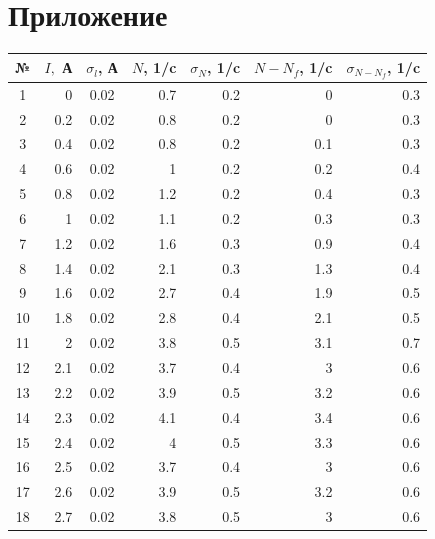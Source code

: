 \documentclass{article}
\begin{document}
\section{Приложение}
\begin{table}[h!]
\centering
\begin{tabular}{|c|r|c|r|r|r|r|}
\hline
№ &
  \multicolumn{1}{c|}{$ I, $ А} &
  $ \sigma_l $, А &
 \multicolumn{1}{c|}{$ N $, 1/c} &
  \multicolumn{1}{l|}{$ \sigma_N $, 1/c} &
  \multicolumn{1}{c|}{$ N - N_f$, 1/c} &
  \multicolumn{1}{c|}{$ \sigma_{N-N_f}$, 1/c} \\ \hline
1                        & 0    & 0.02 & 0.7  & 0.2  & 0    & 0.3 \\ \hline
2                        & 0.2  & 0.02 & 0.8  & 0.2  & 0    & 0.3 \\ \hline
3                        & 0.4  & 0.02 & 0.8  & 0.2  & 0.1  & 0.3 \\ \hline
4                        & 0.6  & 0.02 & 1    & 0.2  & 0.2  & 0.4 \\ \hline
5                        & 0.8  & 0.02 & 1.2  & 0.2  & 0.4  & 0.3 \\ \hline
6                        & 1    & 0.02 & 1.1  & 0.2  & 0.3  & 0.3 \\ \hline
7                        & 1.2  & 0.02 & 1.6  & 0.3  & 0.9  & 0.4 \\ \hline
8                        & 1.4  & 0.02 & 2.1  & 0.3  & 1.3  & 0.4 \\ \hline
9                        & 1.6  & 0.02 & 2.7  & 0.4  & 1.9  & 0.5 \\ \hline
10                       & 1.8  & 0.02 & 2.8  & 0.4  & 2.1  & 0.5 \\ \hline
11                       & 2    & 0.02 & 3.8  & 0.5  & 3.1  & 0.7 \\ \hline
12                       & 2.1  & 0.02 & 3.7  & 0.4  & 3    & 0.6 \\ \hline
13                       & 2.2  & 0.02 & 3.9  & 0.5  & 3.2  & 0.6 \\ \hline
14                       & 2.3  & 0.02 & 4.1  & 0.4  & 3.4  & 0.6 \\ \hline
15                       & 2.4  & 0.02 & 4    & 0.5  & 3.3  & 0.6 \\ \hline
16                       & 2.5  & 0.02 & 3.7  & 0.4  & 3    & 0.6 \\ \hline
17                       & 2.6  & 0.02 & 3.9  & 0.5  & 3.2  & 0.6 \\ \hline
18                       & 2.7  & 0.02 & 3.8  & 0.5  & 3    & 0.6 \\ \hline

\end{tabular}
\end{table}
\end{document}
